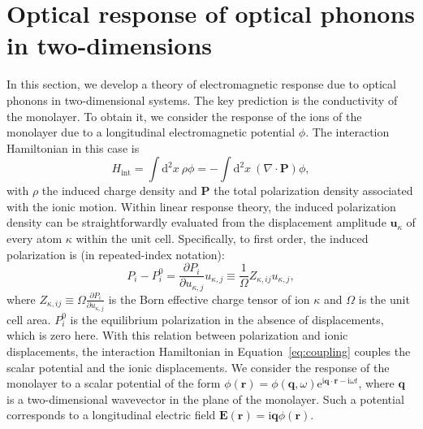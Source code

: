 \documentclass[aps,prb,twocolumn,
	           groupedaddress,superscriptaddress,
               amsfonts,amssymb,amsmath,floatfix,
	           citeautoscript]{revtex4-1}
\newcommand{\iu}{\mathrm{i}}
\newcommand{\e}{\mathrm{e}}
\newcommand{\dd}{\mathrm{d}}
\begin{document}
\section{Optical response of optical phonons in two-dimensions}
In this section, we develop a theory of electromagnetic response due to optical phonons in two-dimensional systems. The key prediction is the conductivity of the monolayer. To obtain it, we consider the response of the ions of the monolayer due to a longitudinal electromagnetic potential $\phi$. The interaction Hamiltonian in this case is
\begin{equation}
    H_{\mathrm{int}} = \int \dd^2x ~\rho \phi = -\int \dd^2x~ (\nabla\cdot\mathbf{P})\phi,
    \label{eq:coupling}
\end{equation} 
with $\rho$ the induced charge density and $\mathbf{P}$ the total polarization density associated with the ionic motion. 
Within linear response theory, the induced polarization density can be straightforwardly evaluated from the displacement amplitude $\mathbf{u}_{\kappa}$ of every atom $\kappa$ within the unit cell. Specifically, to first order, the induced polarization is (in repeated-index notation):
\begin{equation}
    P_i - P_i^{0} = \frac{\partial P_i}{\partial u_{\kappa,j}}u_{\kappa,j} \equiv \frac{1}{\Omega}Z_{\kappa,ij}u_{\kappa,j},
\end{equation} 
where $Z_{\kappa,ij} \equiv \Omega\frac{\partial P_i}{\partial u_{\kappa,j}} $ is the Born effective charge tensor of ion $\kappa$ and $\Omega$ is the unit cell area. $P_i^{0}$ is the equilibrium polarization in the absence of displacements, which is zero here. With this relation between polarization and ionic displacements, the interaction Hamiltonian in Equation~\eqref{eq:coupling} couples the scalar potential and the ionic displacements.  We consider the response of the monolayer to a scalar potential of the form $\phi(\mathbf{r}) = \phi(\mathbf{q},\omega)\e^{\iu\mathbf{q}\cdot\mathbf{r}-\iu\omega t}$, where $\mathbf{q}$ is a two-dimensional wavevector in the plane of the monolayer. Such a potential corresponds to a longitudinal electric field  $\mathbf{E}(\mathbf{r}) = \iu\mathbf{q}\phi(\mathbf{r})$. 
\end{document}
